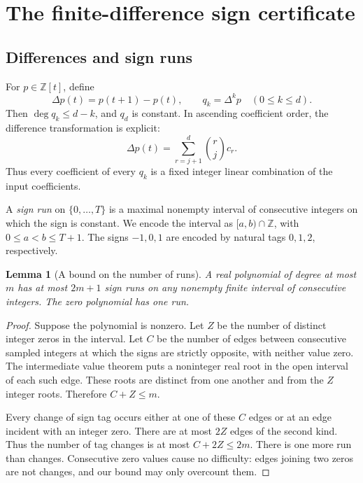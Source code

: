 \documentclass[11pt,a4paper]{article}
\newtheorem{lemma}[lemma]{Lemma}
\theoremstyle{definition}
\theoremstyle{remark}
\newcommand{\Z}{\mathbb Z}
\newcommand{\srctag}[1]{\texorpdfstring{\hspace{0.5em}{\normalfont\small\color{accent}[#1]}}{ [#1]}}
\begin{document}
\section{The finite-difference sign certificate\srctag{02}}
\label{cdc:pt:sec:sign-tower}

\subsection{Differences and sign runs}
For $p\in\Z[t]$, define
\[
 \Delta p(t)=p(t+1)-p(t),\qquad q_k=\Delta^kp\quad(0\leq k\leq d).
\]
Then $\deg q_k\leq d-k$, and $q_d$ is constant. In ascending coefficient
order, the difference transformation is explicit:
\begin{equation}
 [t^j]\Delta p(t)=\sum_{r=j+1}^d\binom rj c_r.
 \label{cdc:pt:eq:coefficient-difference}
\end{equation}
Thus every coefficient of every $q_k$ is a fixed integer linear
combination of the input coefficients.

A \emph{sign run} on $\{0,\ldots,T\}$ is a maximal nonempty interval of
consecutive integers on which the sign is constant. We encode the interval
as $[a,b)\cap\Z$, with $0\leq a<b\leq T+1$. The signs $-1,0,1$ are
encoded by natural tags $0,1,2$, respectively.

\begin{lemma}[A bound on the number of runs]
\label{cdc:pt:lem:runs}
A real polynomial of degree at most $m$ has at most $2m+1$ sign runs on any
nonempty finite interval of consecutive integers. The zero polynomial has
one run.
\end{lemma}
\begin{proof}
Suppose the polynomial is nonzero. Let $Z$ be the number of distinct
integer zeros in the interval. Let $C$ be the number of edges between
consecutive sampled integers at which the signs are strictly opposite,
with neither value zero. The intermediate value theorem puts a noninteger
real root in the open interval of each such edge. These roots are distinct
from one another and from the $Z$ integer roots. Therefore $C+Z\leq m$.

Every change of sign tag occurs either at one of these $C$ edges or at an
edge incident with an integer zero. There are at most $2Z$ edges of the
second kind. Thus the number of tag changes is at most
$C+2Z\leq2m$. There is one more run than changes. Consecutive zero values
cause no difficulty: edges joining two zeros are not changes, and our bound
may only overcount them.
\end{proof}
\end{document}
